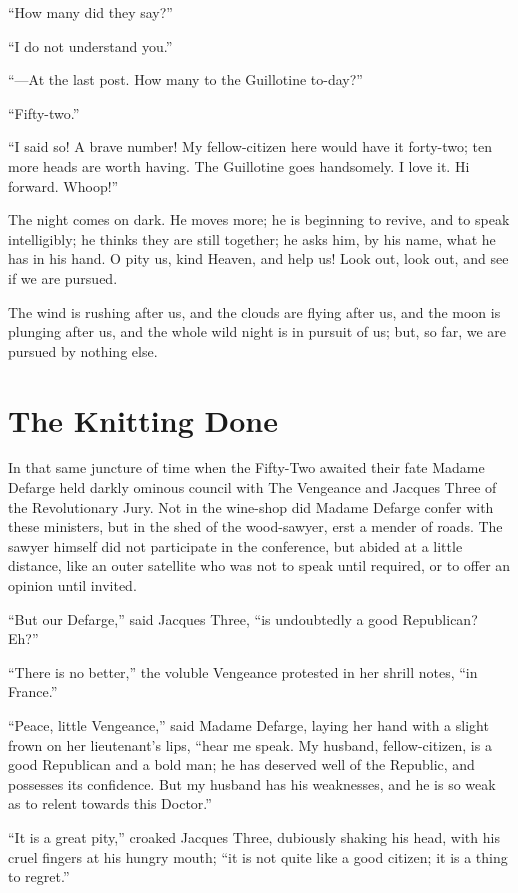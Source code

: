 ``How many did they say?''

``I do not understand you.''

``---At the last post.  How many to the Guillotine to-day?''

``Fifty-two.''

``I said so!  A brave number!  My fellow-citizen here would have it
forty-two; ten more heads are worth having.  The Guillotine goes
handsomely.  I love it.  Hi forward.  Whoop!''

The night comes on dark.  He moves more; he is beginning to revive,
and to speak intelligibly; he thinks they are still together; he asks
him, by his name, what he has in his hand. O pity us, kind Heaven,
and help us!  Look out, look out, and see if we are pursued.

The wind is rushing after us, and the clouds are flying after us, and
the moon is plunging after us, and the whole wild night is in pursuit
of us; but, so far, we are pursued by nothing else.



\chapter{The Knitting Done}


In that same juncture of time when the Fifty-Two awaited their fate
Madame Defarge held darkly ominous council with The Vengeance and
Jacques Three of the Revolutionary Jury.  Not in the wine-shop did
Madame Defarge confer with these ministers, but in the shed of the
wood-sawyer, erst a mender of roads.  The sawyer himself did not
participate in the conference, but abided at a little distance,
like an outer satellite who was not to speak until required, or to
offer an opinion until invited.

``But our Defarge,'' said Jacques Three, ``is undoubtedly a good
Republican?  Eh?''

``There is no better,'' the voluble Vengeance protested in her shrill
notes, ``in France.''

``Peace, little Vengeance,'' said Madame Defarge, laying her hand with
a slight frown on her lieutenant's lips, ``hear me speak.  My husband,
fellow-citizen, is a good Republican and a bold man; he has deserved
well of the Republic, and possesses its confidence.  But my husband
has his weaknesses, and he is so weak as to relent towards this Doctor.''

``It is a great pity,'' croaked Jacques Three, dubiously shaking his
head, with his cruel fingers at his hungry mouth; ``it is not quite
like a good citizen; it is a thing to regret.''

